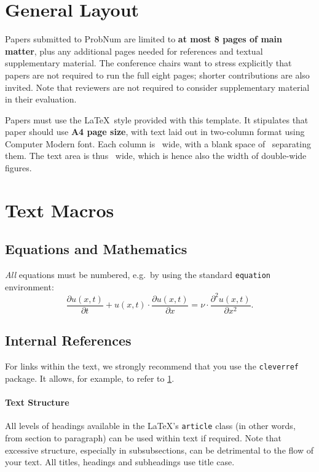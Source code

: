 \documentclass{article}
\affiliation{University of Tübingen, Tübingen AI Center, Germany}
\affiliation{AstraZeneca, Barcelona, Spain}
\affiliation{EURECOM, Sophia Antipolis, France}
\affiliation{University of Southampton, United Kingdom}%
\affiliation{LUT University, Finland}%
\begin{document}
\section{General Layout}
\label{sec:general_layout}

Papers submitted to ProbNum \probnumyearpublic{} are limited to \textbf{at most 8 pages of main matter}, plus any additional pages needed for references and textual supplementary material. The conference chairs want to stress explicitly that papers are not required to run the full eight pages; shorter contributions are also invited. Note that reviewers are not required to consider supplementary material in their evaluation.

Papers must use the \LaTeX\ style provided with this template. It stipulates that paper should use \textbf{A4 page size}, with text laid out in two-column format using Computer Modern font. Each column is \the\columnwidth~wide, with a blank space of \the\columnsep~separating them. The text area is thus \the\textwidth~wide, which is hence also the width of double-wide figures.


\section{Text Macros}

\subsection{Equations and Mathematics}

\emph{All} equations must be numbered, e.g.\ by using the standard \texttt{equation} environment:
\begin{equation}
    \frac{\partial u(x,t)}{\partial t} + u(x,t) \cdot \frac{\partial u(x,t)}{\partial x} = \nu \cdot \frac{\partial^2 u(x,t)}{\partial x^2}.
\end{equation}

\subsection{Internal References}

For links within the text, we strongly recommend that you use the \texttt{cleverref} package. It allows, for example, to refer to \cref{sec:general_layout}.

\paragraph{Text Structure} All levels of headings available in the \LaTeX's \texttt{article} class (in other words, from section to paragraph) can be used within text if required. Note that excessive structure, especially in subsubsections, can be detrimental to the flow of your text.
All titles, headings and subheadings use title case.
\end{document}
